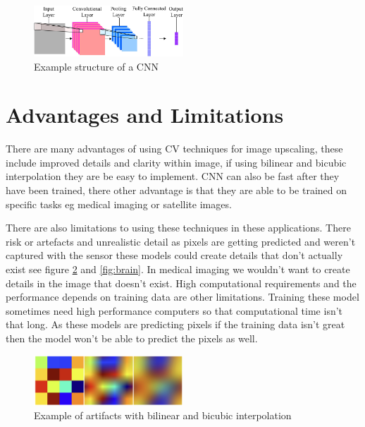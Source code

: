 \documentclass{article}
\begin{document}
\begin{figure}[h]
    \centering
    \includegraphics[width=0.5\textwidth]{fpsyg-08-01745-g001}
    \caption{Example structure of a CNN \cite{10.3389/fpsyg.2017.01745}}
    \label{fig:cnn}
\end{figure}

\section{Advantages and Limitations}

There are many advantages of using CV techniques for image upscaling, these include improved details and clarity within image, if using bilinear and bicubic interpolation they are be easy to implement. CNN can also be fast after they have been trained, there other advantage is that they are able to be trained on specific tasks eg medical imaging or satellite images.

There are also limitations to using these techniques in these applications. There risk or artefacts and unrealistic detail as pixels are getting predicted and weren't captured with the sensor these models could create details that don't actually exist see figure \ref{fig:atrifacts} and \ref{fig:brain}. In medical imaging we wouldn't want to create details in the image that doesn't exist. High computational requirements and the performance depends on training data are other limitations. Training these model sometimes need high performance computers so that computational time isn't that long. As these models are predicting pixels if the training data isn't great then the model won't be able to predict the pixels as well.

\begin{figure}[h]
    \centering
    \includegraphics[width=0.5\textwidth]{changi-screenshot-xb87u3E1@2x}
    \caption{Example of artifacts with bilinear and bicubic interpolation \cite{Jensen2017}}
    \label{fig:atrifacts}
\end{figure}
\end{document}
